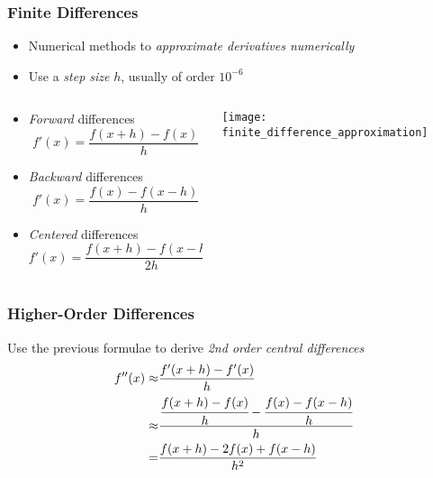 \documentclass[%
  final,
  11pt, 
  show notes, %
  t, %
  fleqn, %
]{beamer}
\begin{document}
\begin{frame}
  \frametitle{Finite Differences}
\begin{itemize}
\item Numerical methods to \emph{approximate derivatives numerically}
\item Use a \emph{step size} $h$, usually of order $10^{-6}$
\end{itemize}
\begin{columns}[T]
\begin{column}{.5\textwidth}
\begin{itemize}
\item \emph{Forward} differences
\begin{equation*}
f'(x) = \frac{f(x + h) - f(x)}{h}
\end{equation*}
\item \emph{Backward} differences
\begin{equation*}
f'(x) = \frac{f(x) - f(x - h)}{h}
\end{equation*}
\item \emph{Centered} differences
\begin{equation*}
f'(x) = \frac{f(x + h) - f(x - h)}{2h}
\end{equation*}
\end{itemize}
\end{column}
\begin{column}{.4\textwidth}
\hspace*{-0.5cm}\texttt{[image: finite\_difference\_approximation]}
\end{column}
\end{columns}
\end{frame}

\begin{frame}
  \frametitle{Higher-Order Differences}
Use the previous formulae to derive \emph{2nd order central differences}
\begin{align*}
f''(x) \approx & \frac{f'(x+h) - f'(x)}{h} \\
\approx & \frac{\cfrac{f(x+h)-f(x)}{h} - \cfrac{f(x)-f(x-h)}{h}}{h} \\
= & \frac{f(x+h) - 2f(x) + f(x-h)}{h^2}
\end{align*}
\end{frame}
\end{document}
